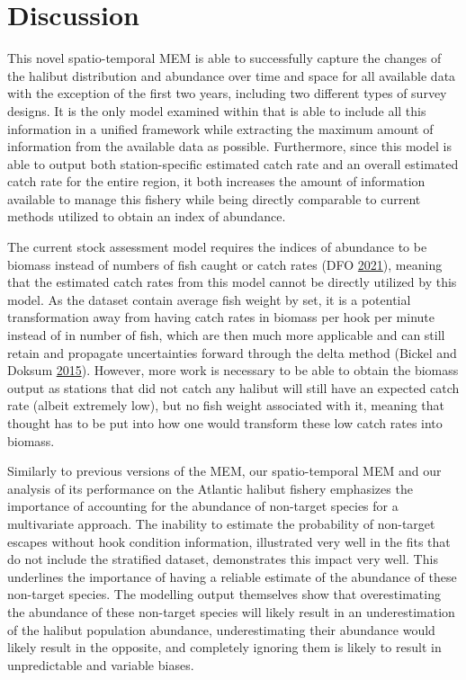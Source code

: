 \documentclass[12pt]{article}\usepackage[]{graphicx}\usepackage[]{color}
\begin{document}
\hypertarget{discussion}{%
\section{Discussion}\label{discussion}}

This novel spatio-temporal MEM is able to successfully capture the changes of the halibut distribution and abundance over time and space for all available data with the exception of the first two years, including two different types of survey designs. It is the only model examined within that is able to include all this information in a unified framework while extracting the maximum amount of information from the available data as possible. Furthermore, since this model is able to output both station-specific estimated catch rate and an overall estimated catch rate for the entire region, it both increases the amount of information available to manage this fishery while being directly comparable to current methods utilized to obtain an index of abundance.

The current stock assessment model requires the indices of abundance to be biomass instead of numbers of fish caught or catch rates (DFO \protect\hyperlink{ref-DFO2021}{2021}), meaning that the estimated catch rates from this model cannot be directly utilized by this model. As the dataset contain average fish weight by set, it is a potential transformation away from having catch rates in biomass per hook per minute instead of in number of fish, which are then much more applicable and can still retain and propagate uncertainties forward through the delta method (Bickel and Doksum \protect\hyperlink{ref-Bickel2015}{2015}). However, more work is necessary to be able to obtain the biomass output as stations that did not catch any halibut will still have an expected catch rate (albeit extremely low), but no fish weight associated with it, meaning that thought has to be put into how one would transform these low catch rates into biomass.

Similarly to previous versions of the MEM, our spatio-temporal MEM and our analysis of its performance on the Atlantic halibut fishery emphasizes the importance of accounting for the abundance of non-target species for a multivariate approach. The inability to estimate the probability of non-target escapes without hook condition information, illustrated very well in the fits that do not include the stratified dataset, demonstrates this impact very well. This underlines the importance of having a reliable estimate of the abundance of these non-target species. The modelling output themselves show that overestimating the abundance of these non-target species will likely result in an underestimation of the halibut population abundance, underestimating their abundance would likely result in the opposite, and completely ignoring them is likely to result in unpredictable and variable biases.
\end{document}
